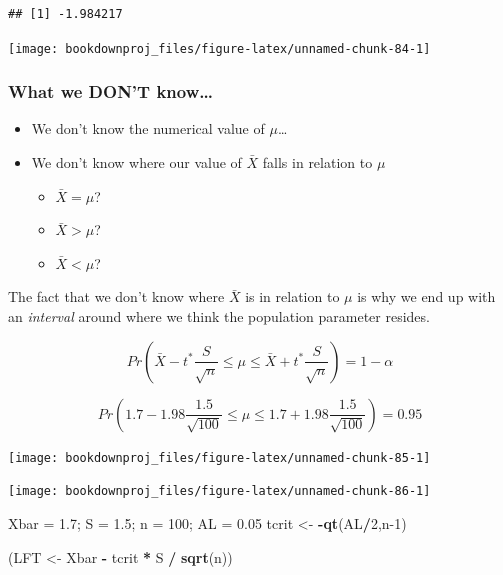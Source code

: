 \documentclass[
]{book}
\newenvironment{Shaded}{\begin{snugshade}}{\end{snugshade}}
\newcommand{\DecValTok}[1]{\textcolor[rgb]{0.00,0.00,0.81}{#1}}
\newcommand{\FloatTok}[1]{\textcolor[rgb]{0.00,0.00,0.81}{#1}}
\newcommand{\FunctionTok}[1]{\textcolor[rgb]{0.13,0.29,0.53}{\textbf{#1}}}
\newcommand{\NormalTok}[1]{#1}
\newcommand{\OtherTok}[1]{\textcolor[rgb]{0.56,0.35,0.01}{#1}}
\newcommand{\SpecialCharTok}[1]{\textcolor[rgb]{0.81,0.36,0.00}{\textbf{#1}}}
\begin{document}
\begin{verbatim}
## [1] -1.984217
\end{verbatim}

\begin{center}\texttt{[image: bookdownproj\_files/figure-latex/unnamed-chunk-84-1]} \end{center}

\subsubsection*{What we DON'T know\ldots{}}\label{what-we-dont-know}

\begin{itemize}
\item
  We don't know the numerical value of \(\mu\)\ldots{}
\item
  We don't know where our value of \(\bar{X}\) falls in relation to \(\mu\)

  \begin{itemize}
  \item
    \(\bar{X}=\mu\)?
  \item
    \(\bar{X}>\mu\)?
  \item
    \(\bar{X}<\mu\)?
  \end{itemize}
\end{itemize}

The fact that we don't know where \(\bar{X}\) is in relation to \(\mu\) is why we end up with an \emph{interval} around where we think the population parameter resides.

\[Pr(\bar{X}-t^* \frac{S}{\sqrt{n}} \leq \mu \leq \bar{X}+t^* \frac{S}{\sqrt{n}}) = 1-\alpha\]

\[Pr(1.7-1.98 \frac{1.5}{\sqrt{100}} \leq \mu \leq 1.7+1.98 \frac{1.5}{\sqrt{100}}) = 0.95\]

\begin{center}\texttt{[image: bookdownproj\_files/figure-latex/unnamed-chunk-85-1]} \end{center}

\begin{center}\texttt{[image: bookdownproj\_files/figure-latex/unnamed-chunk-86-1]} \end{center}

\begin{Shaded}
\begin{Highlighting}[]
\NormalTok{Xbar }\OtherTok{=} \FloatTok{1.7}\NormalTok{; S }\OtherTok{=} \FloatTok{1.5}\NormalTok{; n }\OtherTok{=} \DecValTok{100}\NormalTok{; AL }\OtherTok{=} \FloatTok{0.05}
\NormalTok{tcrit }\OtherTok{\textless{}{-}} \SpecialCharTok{{-}}\FunctionTok{qt}\NormalTok{(AL}\SpecialCharTok{/}\DecValTok{2}\NormalTok{,n}\DecValTok{{-}1}\NormalTok{)}

\NormalTok{(LFT }\OtherTok{\textless{}{-}}\NormalTok{ Xbar }\SpecialCharTok{{-}}\NormalTok{ tcrit }\SpecialCharTok{*}\NormalTok{ S }\SpecialCharTok{/} \FunctionTok{sqrt}\NormalTok{(n))}
\end{Highlighting}
\end{Shaded}
\end{document}
